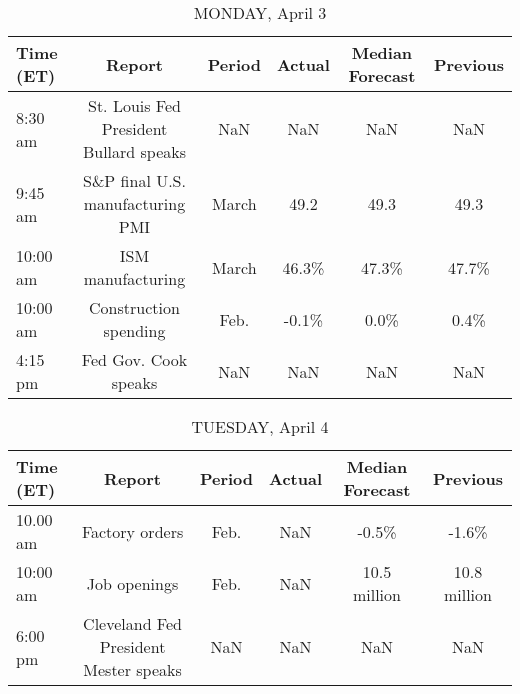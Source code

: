 \documentclass{article}%
\begin{document}
%
\normalsize%


\begin{table}[htbp]%
\caption{MONDAY, April 3}%
\centering%
\begin{adjustbox}{width=1\textwidth}%
\begin{tabular}{lccccc}
\toprule
Time (ET) &                                 Report & Period & Actual & Median Forecast & Previous \\
\midrule
  8:30 am & St. Louis Fed President Bullard speaks &    NaN &    NaN &             NaN &      NaN \\
  9:45 am &       S\&P final U.S. manufacturing PMI &  March &   49.2 &            49.3 &     49.3 \\
 10:00 am &                      ISM manufacturing &  March &  46.3\% &           47.3\% &    47.7\% \\
 10:00 am &                  Construction spending &   Feb. &  -0.1\% &            0.0\% &     0.4\% \\
  4:15 pm &                   Fed Gov. Cook speaks &    NaN &    NaN &             NaN &      NaN \\
\bottomrule
\end{tabular}
%
\end{adjustbox}%
\end{table}

%


\begin{table}[htbp]%
\caption{TUESDAY, April 4}%
\centering%
\begin{adjustbox}{width=1\textwidth}%
\begin{tabular}{lccccc}
\toprule
Time (ET) &                                Report & Period & Actual & Median Forecast &     Previous \\
\midrule
 10.00 am &                        Factory orders &   Feb. &    NaN &           -0.5\% &        -1.6\% \\
 10:00 am &                          Job openings &   Feb. &    NaN &    10.5 million & 10.8 million \\
  6:00 pm & Cleveland Fed President Mester speaks &    NaN &    NaN &             NaN &          NaN \\
\bottomrule
\end{tabular}
%
\end{adjustbox}%
\end{table}

%
\end{document}
